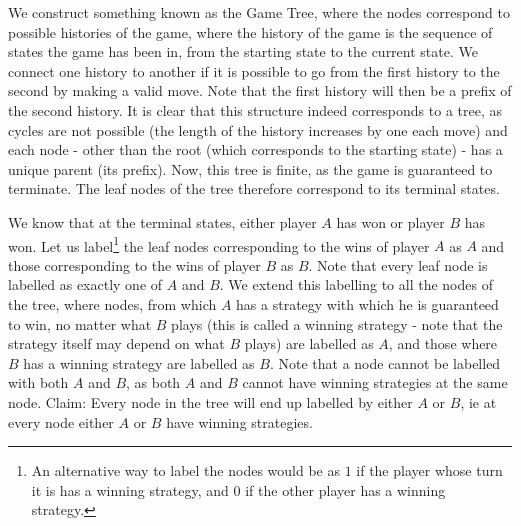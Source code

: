 \documentclass[12pt]{report}
\begin{document}
We construct something known as the Game Tree, where the nodes correspond to possible histories of the game, where the history of the game is the sequence of states the game has been in, from the starting state to the current state. We connect one history to another if it is possible to go from the first history to the second by making a valid move. Note that the first history will then be a prefix of the second history. It is clear that this structure indeed corresponds to a tree, as cycles are not possible (the length of the history increases by one each move) and each node - other than the root (which corresponds to the starting state) - has a unique parent (its prefix). Now, this tree is finite, as the game is guaranteed to terminate. The leaf nodes of the tree therefore correspond to its terminal states. 

We know that at the terminal states, either player $A$ has won or player $B$ has won. Let us label\footnote{An alternative way to label the nodes would be as $1$ if the player whose turn it is has a winning strategy, and $0$ if the other player has a winning strategy.} the leaf nodes corresponding to the wins of player $A$ as $A$ and those corresponding to the wins of player $B$ as $B$. Note that every leaf node is labelled as exactly one of $A$ and $B$. We extend this labelling to all the nodes of the tree, where nodes, from which $A$ has a strategy with which he is guaranteed to win, no matter what $B$ plays (this is called a winning strategy - note that the strategy itself may depend on what $B$ plays) are labelled as $A$, and those where $B$ has a winning strategy are labelled as $B$. Note that a node cannot be labelled with both $A$ and $B$, as both $A$ and $B$ cannot have winning strategies at the same node. Claim: Every node in the tree will end up labelled by either $A$ or $B$, ie at every node either $A$ or $B$ have winning strategies.
\end{document}
